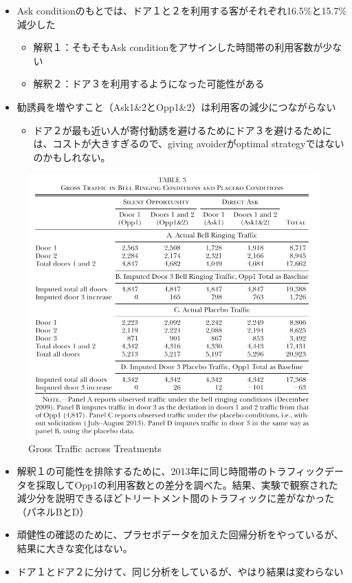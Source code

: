 \documentclass[../root]{subfiles}
\begin{document}
    \begin{itemize}
        \item Ask conditionのもとでは、ドア１と２を利用する客がそれぞれ16.5\%と15.7\%減少した
        \begin{itemize}
            \item 解釈１：そもそもAsk conditionをアサインした時間帯の利用客数が少ない
            \item 解釈２：ドア３を利用するようになった可能性がある
        \end{itemize}
        \item 勧誘員を増やすこと（Ask1\&2とOpp1\&2）は利用客の減少につながらない
        \begin{itemize}
            \item ドア２が最も近い人が寄付勧誘を避けるためにドア３を避けるためには、コストが大きすぎるので、giving avoiderがoptimal strategyではないのかもしれない。
        \end{itemize}
    \end{itemize}

    \begin{figure}[t]
        \centering
        \includegraphics[width=.8\linewidth]{0821kato/fig6_1.png}
        \caption{Gross Traffic across Treatments}
        \label{}
    \end{figure}

    \begin{itemize}
        \item 解釈１の可能性を排除するために、2013年に同じ時間帯のトラフィックデータを採取してOpp1の利用客数との差分を調べた。結果、実験で観察された減少分を説明できるほどトリートメント間のトラフィックに差がなかった（パネルBとD）
        \item 頑健性の確認のために、プラセボデータを加えた回帰分析をやっているが、結果に大きな変化はない。
        \item ドア１とドア２に分けて、同じ分析をしているが、やはり結果は変わらない
    \end{itemize}
\end{document}
